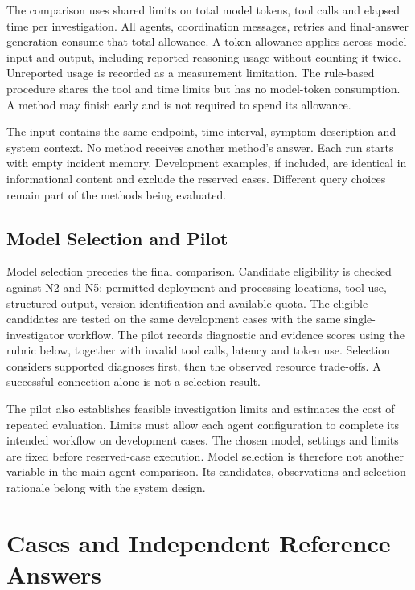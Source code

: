 The comparison uses shared limits on total model tokens, tool calls and
elapsed time per investigation. All agents, coordination messages,
retries and final-answer generation consume that total allowance. A token
allowance applies across model input and output, including reported
reasoning usage without counting it twice. Unreported usage is recorded
as a measurement limitation. The rule-based procedure shares the tool
and time limits but has no model-token consumption. A method may finish
early and is not required to spend its allowance.

The input contains the same endpoint, time interval, symptom description
and system context. No method receives another method's answer. Each run
starts with empty incident memory. Development examples, if included,
are identical in informational content and exclude the reserved cases.
Different query choices remain part of the methods being evaluated.

\subsection{Model Selection and Pilot}

Model selection precedes the final comparison. Candidate eligibility is
checked against N2 and N5: permitted deployment and processing locations,
tool use, structured output, version identification and available quota.
The eligible candidates are tested on the same development cases with
the same single-investigator workflow. The pilot records diagnostic and
evidence scores using the rubric below, together with invalid tool calls,
latency and token use. Selection considers supported diagnoses first,
then the observed resource trade-offs. A successful connection alone is
not a selection result.

The pilot also establishes feasible investigation limits and estimates
the cost of repeated evaluation. Limits must allow each agent
configuration to complete its intended workflow on development cases.
The chosen model, settings and limits are fixed before reserved-case
execution. Model selection is therefore not another variable in the
main agent comparison. Its candidates, observations and selection
rationale belong with the system design.

\section{Cases and Independent Reference Answers}
\label{sec:methodology:cases}

